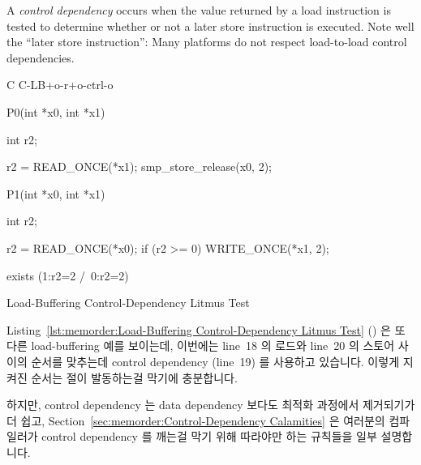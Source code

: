 A \emph{control dependency} occurs when the value returned by a load
instruction is tested to determine whether or not a later store instruction
is executed.
Note well the ``later store instruction'': Many platforms do not respect
load-to-load control dependencies.
\fi

\begin{listing}[tbp]
{ \scriptsize
\begin{verbbox}[\LstLineNo]
C C-LB+o-r+o-ctrl-o
{
}

P0(int *x0, int *x1)
{
  int r2;

  r2 = READ_ONCE(*x1);
  smp_store_release(x0, 2);
}


P1(int *x0, int *x1)
{
  int r2;

  r2 = READ_ONCE(*x0);
  if (r2 >= 0)
    WRITE_ONCE(*x1, 2);
}

exists (1:r2=2 /\ 0:r2=2)
\end{verbbox}
}
\centering
\theverbbox
\caption{Load-Buffering Control-Dependency Litmus Test}
\label{lst:memorder:Load-Buffering Control-Dependency Litmus Test}
\end{listing}

Listing~\ref{lst:memorder:Load-Buffering Control-Dependency Litmus Test}
()
은 또다른 load-buffering 예를 보이는데, 이번에는 line~18 의 로드와 line~20 의
스토어 사이의 순서를 맞추는데 control dependency (line~19) 를 사용하고
있습니다.
이렇게 지켜진 순서는  절이 발동하는걸 막기에 충분합니다.

하지만, control dependency 는 data dependency 보다도 최적화 과정에서 제거되기가 더 쉽고,
Section~\ref{sec:memorder:Control-Dependency Calamities}
은 여러분의 컴파일러가 control dependency 를 깨는걸 막기 위해 따라야만 하는
규칙들을 일부 설명합니다.

